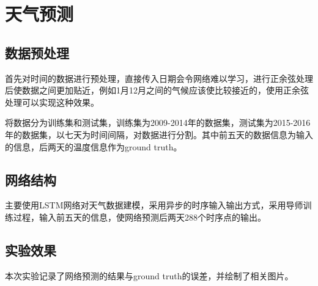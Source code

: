 \documentclass[UTF8]{ctexart}
\begin{document}
\section{天气预测}

\subsection{数据预处理}
首先对时间的数据进行预处理，直接传入日期会令网络难以学习，进行正余弦处理后使数据之间更加贴近，例如1月12月之间的气候应该使比较接近的，使用正余弦处理可以实现这种效果。 \par
将数据分为训练集和测试集，训练集为2009-2014年的数据集，测试集为2015-2016年的数据集，以七天为时间间隔，对数据进行分割。其中前五天的数据信息为输入的信息，后两天的温度信息作为ground truth。\par 




\subsection{网络结构}
主要使用LSTM网络对天气数据建模，采用异步的时序输入输出方式，采用导师训练过程，输入前五天的信息，使网络预测后两天288个时序点的输出。\par 

\subsection{实验效果}
本次实验记录了网络预测的结果与ground truth的误差，并绘制了相关图片。\par
\end{document}
